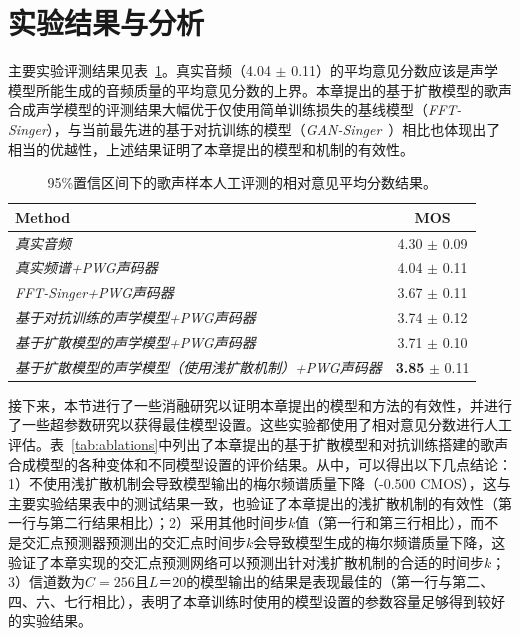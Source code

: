 \section{实验结果与分析}
主要实验评测结果见表~\ref{tab:main_exp}。真实音频（4.04 $\pm$ 0.11）的平均意见分数应该是声学模型所能生成的音频质量的平均意见分数的上界。本章提出的基于扩散模型的歌声合成声学模型的评测结果大幅优于仅使用简单训练损失的基线模型（\textit{FFT-Singer}），与当前最先进的基于对抗训练的模型（\textit{GAN-Singer}~\cite{wu2020adversarially}）相比也体现出了相当的优越性，上述结果证明了本章提出的模型和机制的有效性。
\begin{table}[!h]
	\centering
	\setlength{\belowcaptionskip}{8pt} %
	\caption{95\%置信区间下的歌声样本人工评测的相对意见平均分数结果。}
	\begin{tabular}{|l|c|}
		\toprule
		Method &  MOS  \\
		\midrule
		\textit{真实音频} & 4.30 $\pm$ 0.09  \\
	    \textit{真实频谱+PWG声码器} & 4.04 $\pm$ 0.11  \\
		\midrule
		\textit{FFT-Singer+PWG声码器} & 3.67 $\pm$ 0.11 \\
		\textit{基于对抗训练的声学模型+PWG声码器} & 3.74 $\pm$ 0.12  \\
		\midrule
		\textit{基于扩散模型的声学模型+PWG声码器} & 3.71 $\pm$ 0.10 \\
		\textit{基于扩散模型的声学模型（使用浅扩散机制）+PWG声码器} & \textbf{3.85} $\pm$ 0.11 \\
		\bottomrule
	\end{tabular}
	\label{tab:main_exp}
\end{table}
接下来，本节进行了一些消融研究以证明本章提出的模型和方法的有效性，并进行了一些超参数研究以获得最佳模型设置。这些实验都使用了相对意见分数进行人工评估。表~\ref{tab:ablations}中列出了本章提出的基于扩散模型和对抗训练搭建的歌声合成模型的各种变体和不同模型设置的评价结果。从中，可以得出以下几点结论：1）不使用浅扩散机制会导致模型输出的梅尔频谱质量下降（-0.500 CMOS），这与主要实验结果表中的测试结果一致，也验证了本章提出的浅扩散机制的有效性（第一行与第二行结果相比）；2）采用其他时间步$k$值（第一行和第三行相比），而不是交汇点预测器预测出的交汇点时间步$k$会导致模型生成的梅尔频谱质量下降，这验证了本章实现的交汇点预测网络可以预测出针对浅扩散机制的合适的时间步$k$；3）信道数为$C=256$且$L＝20$的模型输出的结果是表现最佳的（第一行与第二、四、六、七行相比），表明了本章训练时使用的模型设置的参数容量足够得到较好的实验结果。
